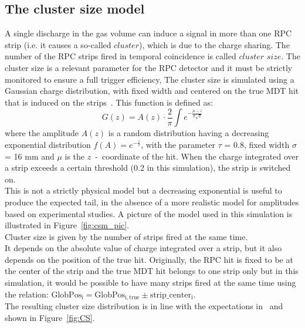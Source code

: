 \subsection{The cluster size model}
\label{sec:CSM}
A single discharge in the gas volume can induce a signal in more than
one RPC strip (i.e. it causes a so-called $cluster$), which is due to the charge sharing.
The number of the RPC strips fired in temporal coincidence is called $cluster$ $size$. 
The cluster size is a relevant parameter for the RPC detector and it must be strictly monitored to 
ensure a full trigger efficiency,
The cluster size is simulated using a Gaussian charge distribution, with fixed width and centered on the true MDT hit that is induced on the strips~\cite{MuonWeek22Oct}. 
This function is defined as:
\begin{equation}
G(z)=A(z)\cdot \frac{2}{\pi} \int{e^{-\frac{\mu-z}{\sigma\sqrt{2}}}}
\end{equation}
where the amplitude $A(z)$ is a random distribution having a decreasing exponential distribution  $f(A)=e^{-\frac{z}{\tau}}$, with the parameter $\tau$ = 0.8, fixed width $\sigma$ = 16 mm and $\mu$ is the $z$~-~coordinate of the hit.
When the charge integrated over a strip exceeds a certain threshold (0.2 in this simulation), the strip is switched on.\\
This is not a strictly physical model but a decreasing exponential is useful to produce the expected tail, in the absence of a more realistic model for amplitudes
based on experimental studies. A picture of the model used in this simulation is illustrated in Figure~\ref{fig:csm_pic}.\\
Cluster size is given by the number of strips fired at the same time. \\
It depends on the absolute value of charge integrated over a strip, but it also depends on the position of the true hit.
Originally, the RPC hit is fixed to be at the center of the strip and the true MDT hit belongs to one strip only but in this simulation, it would be possible to have many strips fired at the same time using the relation: $\mathrm{GlobPos_{i} = GlobPos_{i,true}\pm strip\_center_{i}}$. \\
The resulting cluster size distribution is in line with the expectations in~\cite{TDR} and shown in Figure~\ref{fig:CS}.
